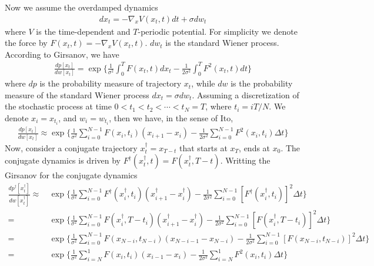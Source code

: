 \documentclass[aps, pre, preprint,unsortedaddress,a4paper,onecolumn]{revtex4}
\newcommand{\dt}[0]{\Delta t}
\begin{document}
Now we assume the overdamped dynamics
\begin{align}\label{eqn:tmp7}
  dx_t = -\nabla_x V(x_t,t) dt + \sigma dw_t
\end{align}
where $V$ is the time-dependent and $T$-periodic potential. For simplicity we denote the force by $F(x_t,t) = -\nabla_x V(x_t, t)$. $dw_t$ is
the standard Wiener process.
According to Girsanov, we have
\begin{align}
  \label{eq:tmp8}
  \frac{dp[x_t]}{dw[x_t]}  =
  \exp \bigg\{
  \frac 1{\sigma^2}\int_0^T F(x_t,t) dx_t -
  \frac1{2\sigma^2}\int_0^T F^2(x_t,t) dt
  \bigg\}
\end{align}
where $dp$ is the probability measure of trajectory $x_t$, while $dw$ is the
probability measure of the standard Wiener process $dx_t = \sigma dw_t$.
Assuming a discretization of the
stochastic process at time $0 < t_1 < t_2 < \cdots < t_N = T$, where
$t_i = iT / N$. We denote $x_i = x_{t_i}$, and $w_i = w_{t_i}$, then we have,
in the sense of Ito,
\begin{align}\label{eq:tmp9}
  \frac{dp[x_t]}{dw[x_t]}  \approx
  \exp\bigg\{\frac1{\sigma^2}\sum_{i=0}^{N-1} F(x_{i},t_{i})(x_{i+1} - x_i) -\frac1{2\sigma^2}\sum_{i=0}^{N-1}F^2(x_i,t_i)\dt\bigg\} 
\end{align}
Now, consider a conjugate trajectory $x^\dagger_t = x_{T-t}$ that starts at $x_T$, ends at $x_0$. The conjugate dynamics is driven by  $F^\dagger(x^\dagger_t,t) = F(x^\dagger_t, T-t)$.
Writting the Girsanov for the conjugate dynamics
\begin{align}\label{eq:dagger-0}
  \frac{dp^\dagger[x^\dagger_t]}{dw[x^\dagger_t]}  
  \approx\,&
  \exp\bigg\{
  \frac1{\sigma^2}\sum_{i=0}^{N-1} F^\dagger(x^\dagger_{i},t_{i})(x^\dagger_{i+1} - x^\dagger_i) -
  \frac1{2\sigma^2}\sum_{i=0}^{N-1}[F^\dagger(x^\dagger_i,t_i)]^2\dt\bigg\} \\ \nonumber
  =\,&
  \exp\bigg\{
  \frac1{\sigma^2}\sum_{i=0}^{N-1} F(x^\dagger_{i},T - t_{i})(x^\dagger_{i+1} - x^\dagger_i) -
  \frac1{2\sigma^2}\sum_{i=0}^{N-1}[F(x^\dagger_i, T-t_i)]^2\dt\bigg\} \\\nonumber
  =\,&
  \exp\bigg\{
  \frac1{\sigma^2}\sum_{i=0}^{N-1} F(x_{N-i},t_{N-i})(x_{N-i-1} - x_{N-i}) -
  \frac1{2\sigma^2}\sum_{i=0}^{N-1}[F(x_{N-i},t_{N-i})]^2\dt\bigg\} \\
  = \,&
  \exp\bigg\{
  \frac1{\sigma^2}\sum_{i=N}^{1} F(x_{i},t_{i})(x_{i-1} - x_i) -
  \frac1{2\sigma^2}\sum_{i=N}^{1}F^2(x_i,t_i)\dt\bigg\}
\end{align}
\end{document}
